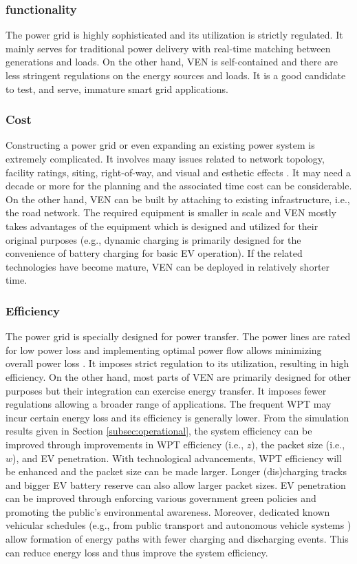 \documentclass[journal]{IEEEtran}
\begin{document}
\subsubsection{functionality}
The power grid is highly sophisticated and its utilization is strictly regulated. It mainly serves for traditional power delivery with real-time matching between generations and loads. On the other hand, VEN is self-contained and there are less stringent regulations on the energy sources and loads. It is a good candidate to test, and serve, immature smart grid applications.
\subsubsection{Cost}
Constructing a power grid or even expanding an existing power system is extremely complicated. It involves many issues related to network topology, facility ratings, siting, right-of-way, and visual and esthetic effects \cite{windcost,SEP1,SEP2}. It may need a decade or more for the planning and the associated time cost can be considerable. On the other hand, VEN can be built by attaching to existing infrastructure, i.e., the road network. The required equipment is smaller in scale and VEN mostly takes advantages of the equipment which is designed and utilized for their original purposes (e.g., dynamic charging is primarily designed for the convenience of battery charging for basic EV operation). If the related technologies have become mature, VEN can be deployed in relatively shorter time.
\subsubsection{Efficiency}
The power grid is specially designed for power transfer. The power lines are rated for low power loss and implementing optimal power flow allows minimizing overall power loss \cite{OPF}. It imposes strict regulation to its utilization, resulting in high efficiency. On the other hand, most parts of VEN are primarily designed for other purposes but their integration can exercise energy transfer. It imposes fewer regulations allowing a broader range of applications. The frequent WPT may incur certain energy loss and its efficiency is generally lower. 
From the simulation results given in Section \ref{subsec:operational}, the system efficiency can be improved through improvements in WPT efficiency (i.e., $z$), the packet size (i.e., $w$), and EV penetration. With technological advancements, WPT efficiency will be enhanced and the packet size can be made larger. Longer (dis)charging tracks and bigger EV battery reserve can also allow larger packet sizes. EV penetration can be improved through enforcing various government green policies and promoting the public's environmental awareness. Moreover, dedicated known vehicular schedules (e.g., from public transport and autonomous vehicle systems \cite{AVPTS}) allow formation of energy paths with fewer charging and discharging events. This can reduce energy loss and thus improve the system efficiency.
\end{document}

